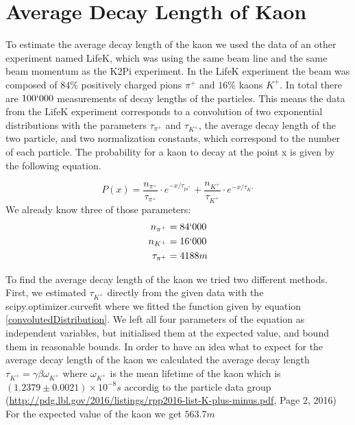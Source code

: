 \documentclass[10pt,a4paper]{report}
\begin{document}
\newpage


\section{Average Decay Length of Kaon}


To estimate the average decay length of the kaon we used the data of an other experiment named LifeK, which was using the same beam line and the same beam momentum as the K2Pi experiment. In the LifeK experiment the beam was composed of $84\%$ positively charged pions $\pi^+$ and $16\%$ kaons $K^+$. In total there are $100`000$ measurements of decay lengths of the particles. This means the data from the LifeK experiment corresponds to a convolution of two exponential distributions with the parameters $\tau_{\pi^+}$ and $\tau_{K^+}$, the average decay length of the two particle, and two normalization constants, which correspond to the number of each particle. The probability for a kaon to decay at the point x is given by the following equation.

\begin{equation}
\label{convolutedDistribution}
P(x)=  \frac{n_{\pi^+}}{\tau_{\pi^+}} \cdot e^{-x/ \tau_{pi^+}} + \frac{n_{K^+}}{\tau_{K^+}} \cdot e^{-x/ \tau_{K^+}}
\end{equation} 
We already know three of those parameters:
\begin{align*}
n_{\pi^+} &= 84`000 \\
n_{K^+} &= 16`000 \\
\tau_{\pi^+} &= 4188 m
\end{align*}

To find the average decay length of the kaon we tried two different methods.\\
First, we estimated $\tau_{K^+}$ directly from the given data with the scipy.optimizer.curvefit where we fitted the function given by equation \ref{convolutedDistribution}. We left all four parameters of the equation as independent variables, but initialised them at the expected value, and bound them in reasonable bounds. In order to have an idea what to expect for the average decay length of the kaon we calculated the average decay length $\tau_{K^+}= \gamma \beta \omega_{K^+}$ where $\omega_{K^+}$ is the mean lifetime of the kaon which is $(1.2379 \pm 0.0021) \times 10^{-8} s $ accordig to the particle data group (\url{http://pdg.lbl.gov/2016/listings/rpp2016-list-K-plus-minus.pdf}, Page 2, 2016) For the expected value of the kaon we get $563.7 m$
\end{document}
